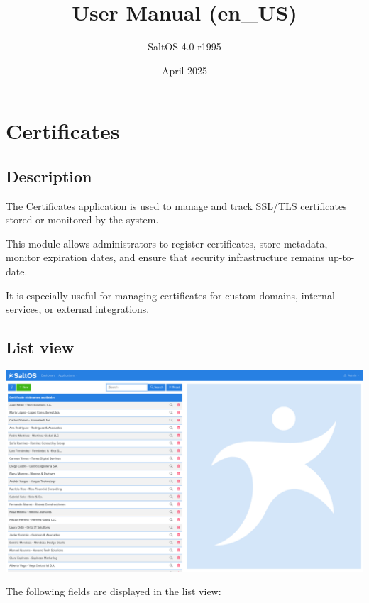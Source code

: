 \documentclass[a4paper]{article}
\title{User Manual (en\_US)}
\author{SaltOS 4.0 r1995}
\begin{document}
\date{April 2025}
\maketitle
\clearpage

\tableofcontents
\clearpage


\hypertarget{toc1}{}
\section{Certificates}

\hypertarget{toc2}{}
\subsection{Description}

The Certificates application is used to manage and track SSL/TLS certificates stored or monitored by the system.

This module allows administrators to register certificates, store metadata, monitor expiration dates,
and ensure that security infrastructure remains up-to-date.

It is especially useful for managing certificates for custom domains, internal services, or external integrations.

\hypertarget{toc3}{}
\subsection{List view}

\begin{center}\includegraphics[width=1\textwidth]{../ujest/snaps/test-screenshots-js-screenshots-certs-certs-list-en-us-1-snap.png}\end{center}

The following fields are displayed in the list view:
\end{document}

